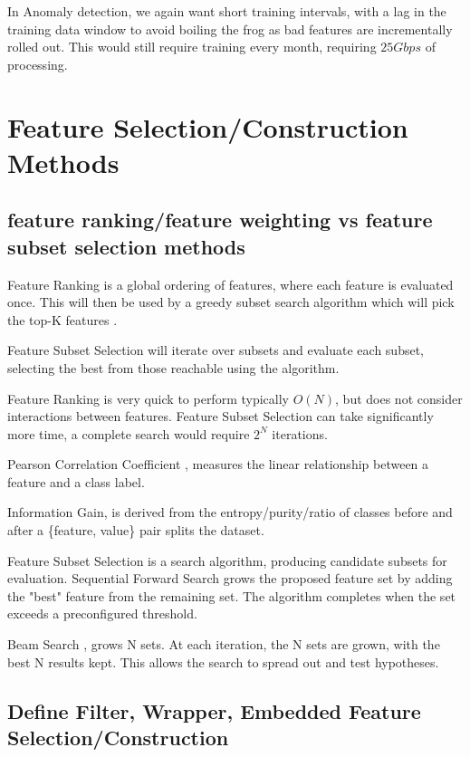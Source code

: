 \documentclass[11pt]{article}
\begin{document}
In Anomaly detection, we again want short training intervals, with a lag in the training data window to avoid boiling the frog as bad features are incrementally rolled out. This would still require training every month, requiring \(25Gbps\) of processing.

\section{Feature Selection/Construction Methods}

\subsection{feature ranking/feature weighting vs feature
	subset selection methods}
	
Feature Ranking is a global ordering of features, where each feature is evaluated once. This will then be used by a greedy subset search algorithm which will pick the top-K features \cite{week3fsfilter}.

Feature Subset Selection will iterate over subsets and evaluate each subset, selecting the best from those reachable using the algorithm.

Feature Ranking is very quick to perform typically \(O(N)\), but does not consider interactions between features. Feature Subset Selection can take significantly more time, a complete search would require \(2^N\) iterations.

Pearson Correlation Coefficient \cite{pearson1895note}, measures the linear relationship between a feature and a class label.

Information Gain, \cite{quinlan:induction} is derived from the entropy/purity/ratio of classes before and after a \{feature, value\} pair splits the dataset.

Feature Subset Selection is a search algorithm, producing candidate subsets for evaluation. Sequential Forward Search \cite{week2featmanip} grows the proposed feature set by adding the "best" feature from the remaining set. The algorithm completes when the set exceeds a preconfigured threshold.

Beam Search \cite{harpy}, grows N sets. At each iteration, the N sets are grown, with the best N results kept. This allows the search to spread out and test hypotheses.

\subsection{Define Filter, Wrapper, Embedded Feature Selection/Construction}
\end{document}
